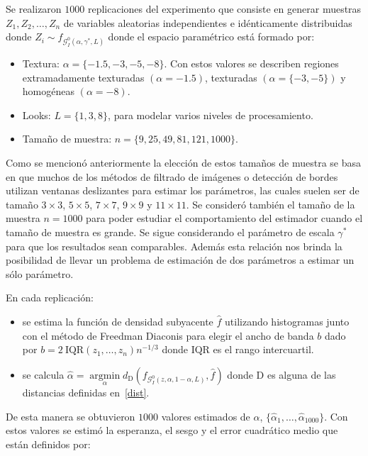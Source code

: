 Se realizaron $1000$ replicaciones del experimento que consiste en generar muestras $Z_1, Z_2,\ldots,Z_n$ de variables aleatorias independientes e idénticamente distribuidas donde $Z_i \sim f_{\mathcal{G}_I^0(\alpha,\gamma^*,L)}$ donde el espacio paramétrico está formado por:

\begin{itemize}
	\item Textura: $\alpha=\{-1.5, -3, -5, -8\}$. Con estos valores se describen regiones extramadamente texturadas $(\alpha=-1.5)$, texturadas $(\alpha=\{-3,-5\})$ y homogéneas $(\alpha=-8)$. 
	\item Looks: $L=\{1,3,8\}$, para modelar varios niveles de procesamiento.
	\item Tamaño de muestra: $n=\{9, 25,49, 81,121,1000\}$. 
\end{itemize}

Como se mencionó anteriormente la elección de estos tamaños de muestra se basa en que muchos de los métodos de filtrado de imágenes o detección de bordes utilizan ventanas deslizantes para estimar los parámetros, las cuales suelen ser de tamaño $3 \times 3$,  $5 \times 5$, $7 \times 7$, $9 \times 9$ y  $11 \times 11$. Se consideró también el tamaño de la muestra $n=1000$ para poder estudiar el comportamiento del estimador cuando el tamaño de muestra es grande. Se sigue considerando el parámetro de escala $\gamma^*$ para que los resultados sean comparables. Además esta relación nos brinda la posibilidad de llevar un problema de estimación de dos parámetros a estimar un sólo parámetro. 


En cada replicación:
\begin{itemize}
	\item se estima la función de densidad subyacente $\widehat{f}$ utilizando histogramas junto con el método de Freedman Diaconis para elegir el ancho de banda $b$ dado por $b=2 \ \text{IQR}(z_1,\ldots,z_n) n^{-1/3}$ donde $\text{IQR}$ es el rango intercuartil.
	\item se calcula $\widehat{\alpha}= \mathop{\text{argmin}}\limits_{\alpha}d_{\text{D}}(f_{\mathcal{G}_I^0(z,\alpha,1-\alpha,L)},\widehat{f})$ donde D es alguna de las distancias definidas en~\ref{dist}.
\end{itemize} 

De esta manera se obtuvieron $1000$ valores estimados de $\alpha$, $\{\widehat{\alpha}_1, \dots, \widehat{\alpha}_{1000}\}$. Con estos valores se estimó la esperanza, el sesgo y el error cuadrático medio que están definidos por:

